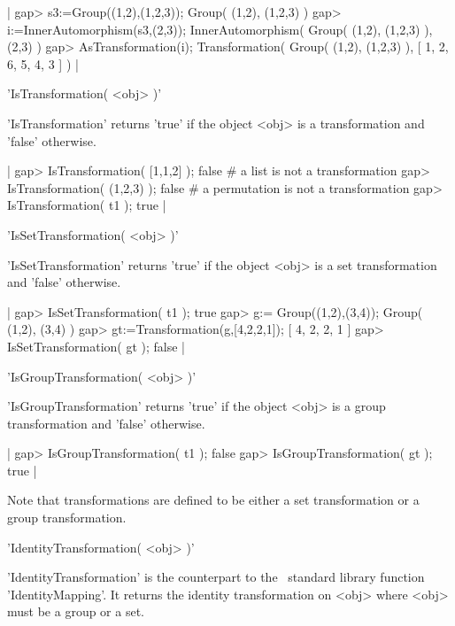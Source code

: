 |  gap> s3:=Group((1,2),(1,2,3));             
  Group( (1,2), (1,2,3) )
  gap> i:=InnerAutomorphism(s3,(2,3));
  InnerAutomorphism( Group( (1,2), (1,2,3) ), (2,3) )
  gap> AsTransformation(i);
  Transformation( Group( (1,2), (1,2,3) ), [ 1, 2, 6, 5, 4, 3 ] )  
|

   
'IsTransformation( <obj> )'

'IsTransformation' returns 'true' if the object <obj> is a 
transformation and 'false' otherwise.

|  gap> IsTransformation( [1,1,2] );
  false                             # a list is not a transformation
  gap> IsTransformation( (1,2,3) );
  false                             # a permutation is not a transformation
  gap> IsTransformation( t1 );
  true
|

   
'IsSetTransformation( <obj> )'

'IsSetTransformation' returns 'true' if the object <obj> is a 
set transformation and 'false' otherwise.

|  gap> IsSetTransformation( t1 );
  true
  gap> g:= Group((1,2),(3,4));
  Group( (1,2), (3,4) )
  gap> gt:=Transformation(g,[4,2,2,1]);
  [ 4, 2, 2, 1 ] 
  gap> IsSetTransformation( gt );
  false
|

   
'IsGroupTransformation( <obj> )'

'IsGroupTransformation' returns 'true' if the object <obj> is a 
group transformation and 'false' otherwise.

|  gap> IsGroupTransformation( t1 );
  false
  gap> IsGroupTransformation( gt );
  true
|

Note that transformations are defined to be either a set transformation or a 
group transformation.

   
'IdentityTransformation( <obj> )'

'Identity\-Trans\-for\-ma\-tion' is the counterpart to the \GAP\ standard
 library function 
'Iden\-ti\-ty\-Mapping'. It returns the identity transformation on 
<obj> 
where <obj> must be a group or a set.

